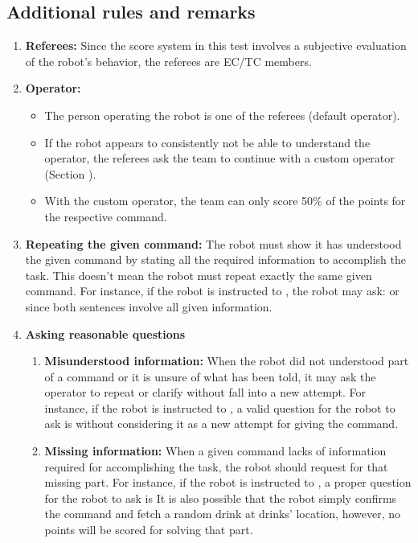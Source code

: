 \subsection{Additional rules and remarks}
\label{sec:gpsr_remarks}
\begin{enumerate}
	\item \textbf{Referees:} Since the score system in this test involves a subjective evaluation of the robot's behavior, the referees are EC/TC members.
	\item \textbf{Operator:}
	\begin{itemize}
		\item The person operating the robot is one of the referees (default operator).
		\item If the robot appears to consistently not be able to understand the operator, the referees ask the team to continue with a custom operator (Section ).
		\item With the custom operator, the team can only score 50\% of the points for the respective command.
	\end{itemize}
	\item \textbf{Repeating the given command:} The robot must show it has understood the given command by stating all the required information to accomplish the task. This doesn't mean the robot must repeat exactly the same given command. For instance, if the robot is instructed to \textit{}, the robot may ask: \textit{} or \textit{} since both sentences involve all given information.
	\item \textbf{Asking reasonable questions} 
	\begin{enumerate}
		\item \textbf{Misunderstood information:} When the robot did not understood part of a command or it is unsure of what has been told, it may ask the operator to repeat or clarify without fall into a new attempt. For instance, if the robot is instructed to \textit{}, a valid question for the robot to ask is \textit{} without considering it as a new attempt for giving the command.
		\item \textbf{Missing information:} When a given command lacks of information required for accomplishing the task, the robot should request for that missing part. For instance, if the robot is instructed to \textit{}, a proper question for the robot to ask is \textit{} It is also possible that the robot simply confirms the command and fetch a random drink at drinks' location, however, no points will be scored for solving that part.

\end{enumerate}
\end{enumerate}
